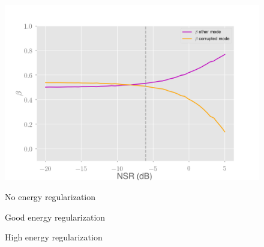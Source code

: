 \documentclass[10pt]{beamer}
\begin{document}
\begin{frame}
\begin{multicols}{2}
\begin{figure}
\begin{overprint}
    \includegraphics[scale=0.2]{figs/high-energy-dm-noisy-beta}
\end{overprint}
\caption{No energy regularization}
\vspace*{-0.9cm}\caption{Good energy regularization}
\vspace*{-0.9cm}\caption{High energy regularization}
\end{figure}
\end{multicols}
\end{frame}
\end{document}
